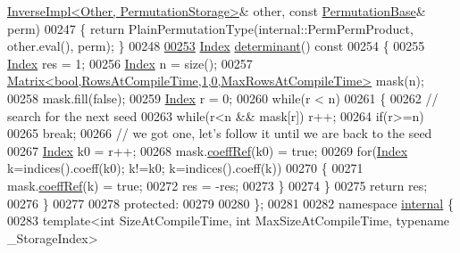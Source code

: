 \begin{DoxyCode}
      \hyperlink{class_eigen_1_1_inverse_impl}{InverseImpl<Other, PermutationStorage>}& other, \textcolor{keyword}{const} 
      \hyperlink{group___core___module_class_eigen_1_1_permutation_base}{PermutationBase}& perm)
00247     \{ \textcolor{keywordflow}{return} PlainPermutationType(internal::PermPermProduct, other.eval(), perm); \}
00248     
\hyperlink{group___core___module_a1fc7a5823544700c2e0795e87f9c6d09}{00253}     \hyperlink{group___core___module_a554f30542cc2316add4b1ea0a492ff02}{Index} \hyperlink{group___core___module_a1fc7a5823544700c2e0795e87f9c6d09}{determinant}()\textcolor{keyword}{ const}
00254 \textcolor{keyword}{    }\{
00255       \hyperlink{group___core___module_a554f30542cc2316add4b1ea0a492ff02}{Index} res = 1;
00256       \hyperlink{group___core___module_a554f30542cc2316add4b1ea0a492ff02}{Index} n = size();
00257       \hyperlink{group___core___module_class_eigen_1_1_matrix}{Matrix<bool,RowsAtCompileTime,1,0,MaxRowsAtCompileTime>}
       mask(n);
00258       mask.fill(\textcolor{keyword}{false});
00259       \hyperlink{group___core___module_a554f30542cc2316add4b1ea0a492ff02}{Index} r = 0;
00260       \textcolor{keywordflow}{while}(r < n)
00261       \{
00262         \textcolor{comment}{// search for the next seed}
00263         \textcolor{keywordflow}{while}(r<n && mask[r]) r++;
00264         \textcolor{keywordflow}{if}(r>=n)
00265           \textcolor{keywordflow}{break};
00266         \textcolor{comment}{// we got one, let's follow it until we are back to the seed}
00267         \hyperlink{group___core___module_a554f30542cc2316add4b1ea0a492ff02}{Index} k0 = r++;
00268         mask.\hyperlink{class_eigen_1_1_plain_object_base_a25626a55b26a4323565f79d1b7c48ea8}{coeffRef}(k0) = \textcolor{keyword}{true};
00269         \textcolor{keywordflow}{for}(\hyperlink{group___core___module_a554f30542cc2316add4b1ea0a492ff02}{Index} k=indices().coeff(k0); k!=k0; k=indices().coeff(k))
00270         \{
00271           mask.\hyperlink{class_eigen_1_1_plain_object_base_a25626a55b26a4323565f79d1b7c48ea8}{coeffRef}(k) = \textcolor{keyword}{true};
00272           res = -res;
00273         \}
00274       \}
00275       \textcolor{keywordflow}{return} res;
00276     \}
00277 
00278   \textcolor{keyword}{protected}:
00279 
00280 \};
00281 
00282 \textcolor{keyword}{namespace }\hyperlink{namespaceinternal}{internal} \{
00283 \textcolor{keyword}{template}<\textcolor{keywordtype}{int} SizeAtCompileTime, \textcolor{keywordtype}{int} MaxSizeAtCompileTime, \textcolor{keyword}{typename} \_StorageIndex>

\end{DoxyCode}
